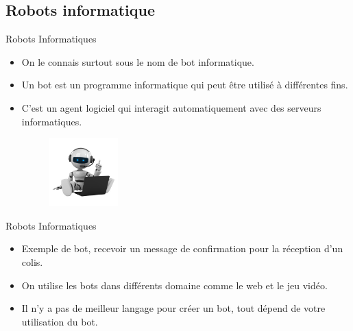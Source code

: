 \documentclass{beamer}
\begin{document}
\subsection{Robots informatique}
\begin{frame}{Robots Informatiques}
\begin{itemize}
    \item On le connais surtout sous le nom de bot informatique. 
    \item Un bot est un programme informatique qui peut être utilisé à différentes fins.
    \item C'est un agent logiciel qui interagit automatiquement avec des serveurs informatiques.
    \begin{figure}
        \centering
        \includegraphics[width=100]{img/bot.png}
        \label{fig:my_label}
    \end{figure}
    
\end{itemize}
\end{frame}

\begin{frame}{Robots Informatiques}
\begin{itemize}
    \item Exemple de bot, recevoir un message de confirmation pour la réception d'un colis.
    \item On utilise les bots dans différents domaine comme le web et le jeu vidéo.
    \item Il n'y a pas de meilleur langage pour créer un bot, tout dépend de votre utilisation du bot. 
\end{itemize}
\end{frame}
\end{document}
